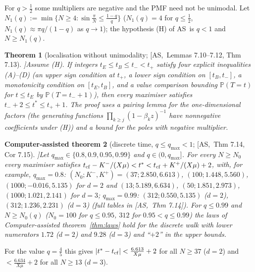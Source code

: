 \documentclass[10pt,a4paper]{article}
\theoremstyle{plain}
\newtheorem{theorem}{Theorem}[section]
\newtheorem{catheorem}[theorem]{Computer-assisted theorem}
\theoremstyle{definition}
\newcommand{\src}[2]{[\textsf{#1},~#2]}           %
\newcommand{\ASY}{\textsf{AS}}
\renewcommand{\P}{\mathbb{P}}
\begin{document}
For $q>\frac12$ some multipliers are negative and the PMF need not be unimodal. Let $N_1(q):=\min\{N\ge4:\sin\frac\pi N\le\frac{1-q}q\}$ ($N_1(q)=4$ for $q\le\frac12$, $N_1(q)\approx\pi q/(1-q)$ as $q\to1$); the hypothesis (H) of \ASY\ is $q<1$ and $N\ge N_1(q)$.

\begin{theorem}[localisation without unimodality; \src{\ASY}{Lemmas 7.10--7.12, Thm 7.13}]\label{thm:localisation}
Assume (H). If integers $t_E\le t_B\le t_-<t_+$ satisfy four explicit inequalities (A)--(D) (an upper sign condition at $t_+$, a lower sign condition on $[t_B,t_-]$, a monotonicity condition on $[t_E,t_B]$, and a value comparison bounding $\P(T=t)$ for $t\le t_E$ by $\P(T=t_-+1)$), then every maximiser satisfies $t_-+2\le t^*\le t_++1$. The proof uses a pairing lemma for the one-dimensional factors (the generating functions $\prod_{k\ge j}(1-\beta_kz)^{-1}$ have nonnegative coefficients under (H)) and a bound for the poles with negative multiplier.
\end{theorem}

\begin{catheorem}[discrete time, $q\le q_{\max}<1$; \src{\ASY}{Thm 7.14, Cor 7.15}]\label{thm:cf-disc-qmax}
Let $q_{\max}\in\{0.8,0.9,0.95,0.99\}$ and $q\in(0,q_{\max}]$. For every $N\ge N_0$ every maximiser satisfies $t_{\rm cf}-K^-/(X\mu)<t^*<t_{\rm cf}+K^+/(X\mu)+2$, with, for example, $q_{\max}=0.8$: $(N_0;K^-,K^+)=(37;2.850,6.613)$, $(100;1.448,5.560)$, $(1000;-0.016,5.135)$ for $d=2$ and $(13;5.189,6.634)$, $(50;1.851,2.973)$, $(1000;1.021,2.141)$ for $d=3$; $q_{\max}=0.99$: $(312;0.550,5.135)$ ($d=2$), $(312;1.236,2.231)$ ($d=3$) (full tables in \src{\ASY}{Thm 7.14}). For $q\le0.99$ and $N\ge N_0(q)$ ($N_0=100$ for $q\le0.95$, $312$ for $0.95<q\le0.99$) the laws of Computer-assisted theorem~\ref{thm:laws} hold for the discrete walk with lower numerators $1.72$ ($d=2$) and $9.28$ ($d=3$) and ``$+2$'' in the upper bounds.
\end{catheorem}
For the value $q=\frac45$ this gives $|t^*-t_{\rm cf}|<\frac{6.613}{X\mu}+2$ for all $N\ge37$ ($d=2$) and $<\frac{6.634}{X\mu}+2$ for all $N\ge13$ ($d=3$).
\end{document}
